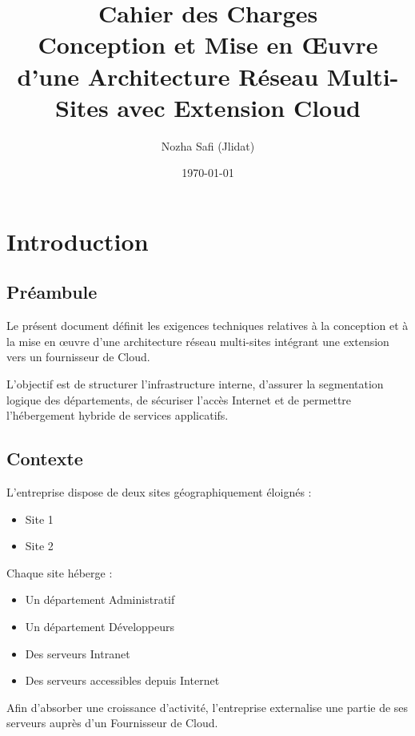 \documentclass[11pt,a4paper]{memoir}%
\title{\textbf{Cahier des Charges}\\
	Conception et Mise en Œuvre d’une Architecture Réseau Multi-Sites avec Extension Cloud}
\author{Nozha Safi (Jlidat)}
\date{\today}
\begin{document}
	
	\maketitle
	\thispagestyle{empty}
	\newpage
	\tableofcontents
	\newpage
\chapter{Introduction}	
	\section{Préambule}
	
	Le présent document définit les exigences techniques relatives à la conception
	et à la mise en œuvre d’une architecture réseau multi-sites intégrant une
	extension vers un fournisseur de Cloud.
	
	L’objectif est de structurer l’infrastructure interne, d’assurer la
	segmentation logique des départements, de sécuriser l’accès Internet et
	de permettre l’hébergement hybride de services applicatifs.
	
	\section{Contexte}
	
	L’entreprise dispose de deux sites géographiquement éloignés :
	
	\begin{itemize}
		\item Site 1
		\item Site 2
	\end{itemize}
	
	Chaque site héberge :
	
	\begin{itemize}
		\item Un département Administratif
		\item Un département Développeurs
		\item Des serveurs Intranet
		\item Des serveurs accessibles depuis Internet
	\end{itemize}
	
	Afin d’absorber une croissance d’activité, l’entreprise externalise
	une partie de ses serveurs auprès d’un Fournisseur de Cloud.
	
\end{document}
